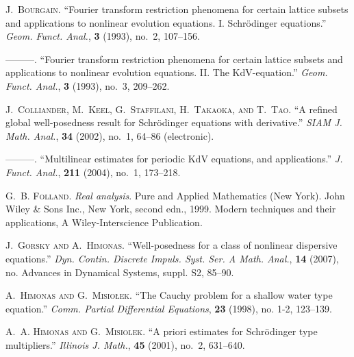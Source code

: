 \documentclass[12pt,reqno]{amsart}
\theoremstyle{plain}  %
\begin{document}
%
%
\begin{thebibliography}{10}
\newcommand{\enquote}[1]{``#1''}

\textsc{J.~Bourgain}.
\newblock \enquote{Fourier transform restriction phenomena for certain lattice
  subsets and applications to nonlinear evolution equations. {I}.
  {S}chr{\"o}dinger equations.}
\newblock \emph{Geom. Funct. Anal.}, \textbf{3} (1993), no.~2, 107--156.

---{}---{}---.
\newblock \enquote{Fourier transform restriction phenomena for certain lattice
  subsets and applications to nonlinear evolution equations. {II}. {T}he
  {K}d{V}-equation.}
\newblock \emph{Geom. Funct. Anal.}, \textbf{3} (1993), no.~3, 209--262.

\textsc{J.~Colliander, M.~Keel, G.~Staffilani, H.~Takaoka, and T.~Tao}.
\newblock \enquote{A refined global well-posedness result for {S}chr{\"o}dinger
  equations with derivative.}
\newblock \emph{SIAM J. Math. Anal.}, \textbf{34} (2002), no.~1, 64--86
  (electronic).

---{}---{}---.
\newblock \enquote{Multilinear estimates for periodic {K}d{V} equations, and
  applications.}
\newblock \emph{J. Funct. Anal.}, \textbf{211} (2004), no.~1, 173--218.

\textsc{G.~B. Folland}.
\newblock \emph{Real analysis}.
\newblock Pure and Applied Mathematics (New York). John Wiley \& Sons Inc., New
  York, second edn., 1999.
\newblock Modern techniques and their applications, A Wiley-Interscience
  Publication.

\textsc{J.~Gorsky and A.~Himonas}.
\newblock \enquote{Well-posedness for a class of nonlinear dispersive
  equations.}
\newblock \emph{Dyn. Contin. Discrete Impuls. Syst. Ser. A Math. Anal.},
  \textbf{14} (2007), no. Advances in Dynamical Systems, suppl. S2, 85--90.

\textsc{A.~Himonas and G.~Misio{\l}ek}.
\newblock \enquote{The {C}auchy problem for a shallow water type equation.}
\newblock \emph{Comm. Partial Differential Equations}, \textbf{23} (1998), no.
  1-2, 123--139.

\textsc{A.~A. Himonas and G.~Misiolek}.
\newblock \enquote{A priori estimates for {S}chr{\"o}dinger type multipliers.}
\newblock \emph{Illinois J. Math.}, \textbf{45} (2001), no.~2, 631--640.


\end{thebibliography}
\end{document}
